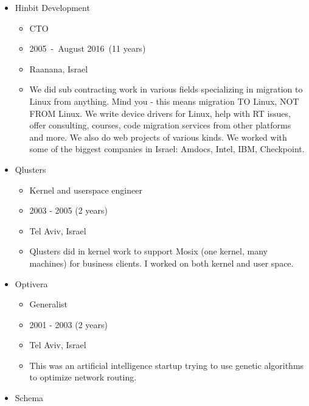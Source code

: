 \documentclass[
]{article}
\providecommand{\tightlist}{%
  \setlength{\itemsep}{0pt}\setlength{\parskip}{0pt}}
\begin{document}
\begin{itemize}
  \begin{itemize}
  \tightlist
  \item
    Core developer
  \item
    2006 - 2011 (5 years)
  \item
    Hatazafon, Israel
  \item
    Did core engineering in a classified project. Linux kernel
    internals, C++ and more.
  \end{itemize}
\item
  Hinbit Development

  \begin{itemize}
  \tightlist
  \item
    CTO
  \item
    2005~-~August 2016~(11 years)
  \item
    Raanana, Israel
  \item
    We did sub contracting work in various fields specializing in
    migration to Linux from anything. Mind you - this means migration TO
    Linux, NOT FROM Linux. We write device drivers for Linux, help with
    RT issues, offer consulting, courses, code migration services from
    other platforms and more. We also do web projects of various kinds.
    We worked with some of the biggest companies in Israel: Amdocs,
    Intel, IBM, Checkpoint.
  \end{itemize}
\item
  Qlusters

  \begin{itemize}
  \tightlist
  \item
    Kernel and userspace engineer
  \item
    2003 - 2005 (2 years)
  \item
    Tel Aviv, Israel
  \item
    Qlusters did in kernel work to support Mosix (one kernel, many
    machines) for business clients. I worked on both kernel and user
    space.
  \end{itemize}
\item
  Optivera

  \begin{itemize}
  \tightlist
  \item
    Generalist
  \item
    2001 - 2003 (2 years)
  \item
    Tel Aviv, Israel
  \item
    This was an artificial intelligence startup trying to use genetic
    algorithms to optimize network routing.
  \end{itemize}
\item
  Schema


\end{itemize}
\end{document}
